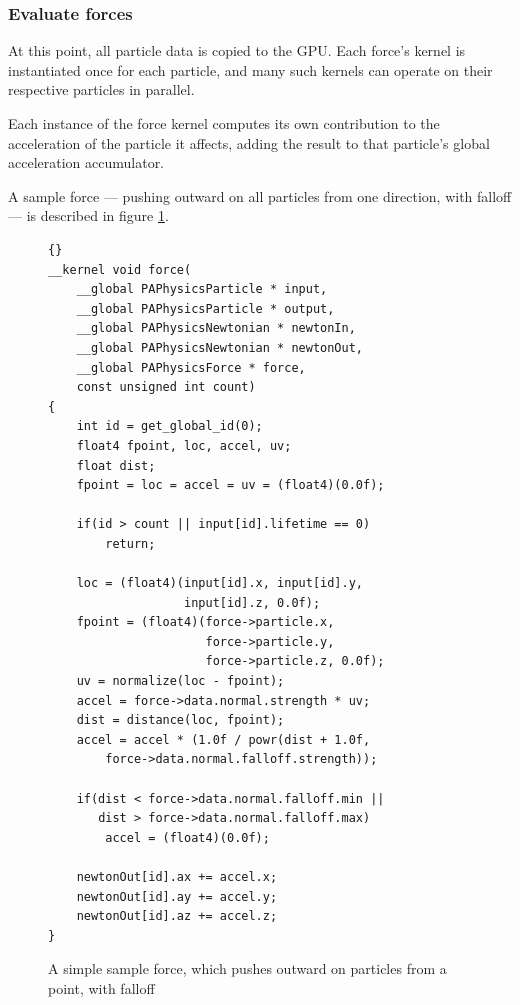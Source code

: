\documentclass{acmsiggraph}
\begin{document}
\subsubsection{Evaluate forces}

At this point, all particle data is copied to the GPU. Each force's kernel is instantiated once for each particle, and many such kernels can operate on their respective particles in parallel.

Each instance of the force kernel computes its own contribution to the acceleration of the particle it affects, adding the result to that particle's global acceleration accumulator.

A sample force --- pushing outward on all particles from one direction, with falloff --- is described in figure \ref{forceCode}.

\begin{figure}

    \lstset{language=C}
    \lstset{basicstyle=\footnotesize\ttfamily}
    \begin{lstlisting}[frame=trbl]{}
__kernel void force(
    __global PAPhysicsParticle * input,
    __global PAPhysicsParticle * output,
    __global PAPhysicsNewtonian * newtonIn,
    __global PAPhysicsNewtonian * newtonOut,
    __global PAPhysicsForce * force,
    const unsigned int count)
{
    int id = get_global_id(0);
    float4 fpoint, loc, accel, uv;
    float dist;
    fpoint = loc = accel = uv = (float4)(0.0f);

    if(id > count || input[id].lifetime == 0)
        return;

    loc = (float4)(input[id].x, input[id].y,
                   input[id].z, 0.0f);
    fpoint = (float4)(force->particle.x,
                      force->particle.y,
                      force->particle.z, 0.0f);
    uv = normalize(loc - fpoint);
    accel = force->data.normal.strength * uv;
    dist = distance(loc, fpoint);
    accel = accel * (1.0f / powr(dist + 1.0f,
        force->data.normal.falloff.strength));

    if(dist < force->data.normal.falloff.min ||
       dist > force->data.normal.falloff.max)
        accel = (float4)(0.0f);

    newtonOut[id].ax += accel.x;
    newtonOut[id].ay += accel.y;
    newtonOut[id].az += accel.z;
}
    \end{lstlisting}

    \caption{A simple sample force, which pushes outward on particles from a point, with falloff}
    \label{forceCode}
\end{figure}
\end{document}
